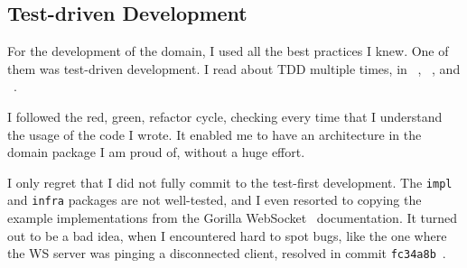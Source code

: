 \subsection{Test-driven Development}\label{sec:test-driven-development}

For the development of the domain,
I used all the best practices I knew.
One of them was test-driven development.
I read about \ac{TDD} multiple times, in
~\cite{beck_test-driven_2002},
~\cite{martin_clean_2011}, and
~\cite{beck_extreme_2004}.

I followed the red, green, refactor cycle,
checking every time that I understand
the usage of the code I wrote.
It enabled me to have an architecture
in the domain package I am proud of,
without a huge effort.

I only regret that
I did not fully commit to the test-first development.
The \texttt{impl} and \texttt{infra} packages
are not well-tested,
and I even resorted to copying the example implementations
from the Gorilla WebSocket~\cite{burd_gorilla_2022} documentation.
It turned out to be a bad idea,
when I encountered hard to spot bugs,
like the one
where the \ac{WS} server
was pinging a disconnected client,
resolved in commit \texttt{fc34a8b}~.

